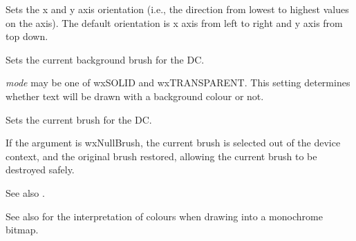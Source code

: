 
Sets the x and y axis orientation (i.e., the direction from lowest to
highest values on the axis). The default orientation is 
x axis from left to right and y axis from top down.





\label{wxdcsetbackground}


Sets the current background brush for the DC.


\label{wxdcsetbackgroundmode}


{\it mode} may be one of wxSOLID and wxTRANSPARENT. This setting determines
whether text will be drawn with a background colour or not.


\label{wxdcsetbrush}


Sets the current brush for the DC.

If the argument is wxNullBrush, the current brush is selected out of the device
context, and the original brush restored, allowing the current brush to
be destroyed safely.

See also .

See also  for the interpretation of colours
when drawing into a monochrome bitmap.

 
\label{wxdcsetclippingregion}




